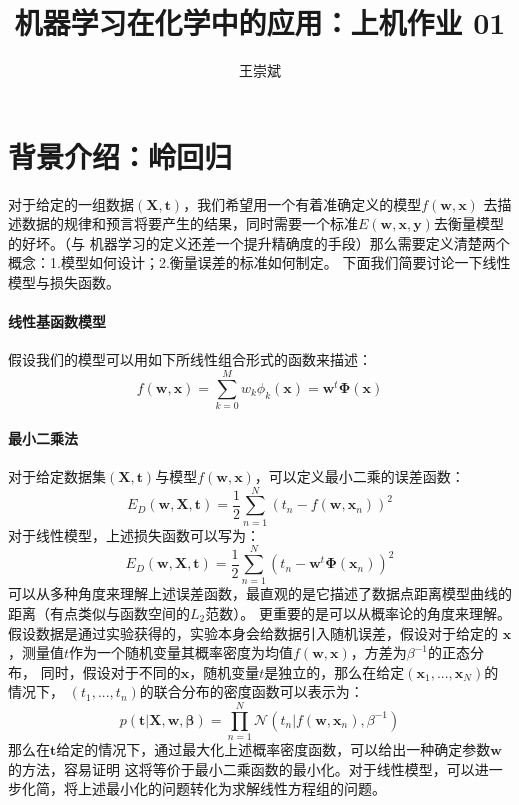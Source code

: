 \documentclass[a4paper,zihao=5,UTF8]{ctexart}
\title{\textbf{机器学习在化学中的应用：上机作业 01}}
\author{王崇斌\;1800011716}
\newcommand{\mb}[1]{\mathbf{#1}}
\begin{document}
	\pagestyle{fancy}
	\pagestyle{fancy}
	\chead{}
	\rhead{\today}
	\maketitle
    \thispagestyle{fancy}
    \section{背景介绍：岭回归}
    对于给定的一组数据$(\mathbf{X}, \mb{t})$，我们希望用一个有着准确定义的模型$f(\mb{w}, \mb{x})$
    去描述数据的规律和预言将要产生的结果，同时需要一个标准$E(\mb{w}, \mb{x}, \mb{y})$去衡量模型的好坏。（与
    机器学习的定义还差一个提升精确度的手段）那么需要定义清楚两个概念：1.模型如何设计；2.衡量误差的标准如何制定。
    下面我们简要讨论一下线性模型与损失函数。
    \paragraph{线性基函数模型}
    假设我们的模型可以用如下所线性组合形式的函数来描述：
    \begin{equation}
        f(\mb{w}, \mb{x}) = \sum_{k=0}^{M}w_k\phi_k(\mb{x}) = \mb{w}^t\mb{\Phi}(\mb{x})
    \end{equation}
    \paragraph{最小二乘法}
    对于给定数据集$(\mb{X}, \mb{t})$与模型$f(\mb{w},\mb{x})$，可以定义最小二乘的误差函数：
    \begin{equation}
        E_{D}(\mb{w}, \mb{X}, \mb{t}) = \dfrac{1}{2}\sum_{n=1}^{N}(t_n - f(\mb{w}, \mb{x}_n))^2
    \end{equation}
    对于线性模型，上述损失函数可以写为：
    \begin{equation}
        E_{D}(\mb{w}, \mb{X}, \mb{t}) = \dfrac{1}{2}\sum_{n=1}^{N}(t_n - \mb{w}^t\mb{\Phi}(\mb{x}_n))^2
    \end{equation}
    可以从多种角度来理解上述误差函数，最直观的是它描述了数据点距离模型曲线的距离（有点类似与函数空间的$L_2$范数）。
    更重要的是可以从概率论的角度来理解。假设数据是通过实验获得的，实验本身会给数据引入随机误差，假设对于给定的
    $\mb{x}$，测量值$t$作为一个随机变量其概率密度为均值$f(\mb{w}, \mb{x})$，方差为$\beta^{-1}$的正态分布，
    同时，假设对于不同的$\mb{x}$，随机变量$t$是独立的，那么在给定$(\mb{x}_1, ...,\mb{x}_N)$的情况下，
    $(t_1,...,t_n)$的联合分布的密度函数可以表示为：
    \begin{equation}
        p(\mb{t}|\mb{X}, \mb{w}, \mb{\beta}) = \prod_{n=1}^{N}\mathcal{N}(t_n|f(\mb{w}, \mb{x}_n),\beta^{-1})
    \end{equation}
    那么在$\mb{t}$给定的情况下，通过最大化上述概率密度函数，可以给出一种确定参数$\mb{w}$的方法，容易证明
    这将等价于最小二乘函数的最小化。对于线性模型，可以进一步化简，将上述最小化的问题转化为求解线性方程组的问题。
\end{document}
